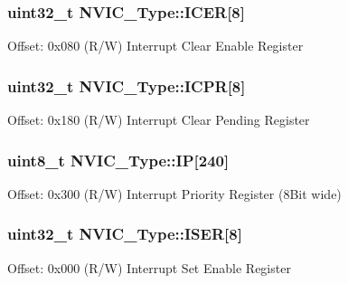 \subsubsection[{\texorpdfstring{I\+C\+ER}{ICER}}]{ uint32\+\_\+t N\+V\+I\+C\+\_\+\+Type\+::\+I\+C\+ER\mbox{[}8\mbox{]}}\hypertarget{struct_n_v_i_c___type_a1965a2e68b61d2e2009621f6949211a5}{}\label{struct_n_v_i_c___type_a1965a2e68b61d2e2009621f6949211a5}
Offset\+: 0x080 (R/W) Interrupt Clear Enable Register 
\subsubsection[{\texorpdfstring{I\+C\+PR}{ICPR}}]{ uint32\+\_\+t N\+V\+I\+C\+\_\+\+Type\+::\+I\+C\+PR\mbox{[}8\mbox{]}}\hypertarget{struct_n_v_i_c___type_a46241be64208436d35c9a4f8552575c5}{}\label{struct_n_v_i_c___type_a46241be64208436d35c9a4f8552575c5}
Offset\+: 0x180 (R/W) Interrupt Clear Pending Register 
\subsubsection[{\texorpdfstring{IP}{IP}}]{ uint8\+\_\+t N\+V\+I\+C\+\_\+\+Type\+::\+IP\mbox{[}240\mbox{]}}\hypertarget{struct_n_v_i_c___type_a6524789fedb94623822c3e0a47f3d06c}{}\label{struct_n_v_i_c___type_a6524789fedb94623822c3e0a47f3d06c}
Offset\+: 0x300 (R/W) Interrupt Priority Register (8\+Bit wide) 
\subsubsection[{\texorpdfstring{I\+S\+ER}{ISER}}]{ uint32\+\_\+t N\+V\+I\+C\+\_\+\+Type\+::\+I\+S\+ER\mbox{[}8\mbox{]}}\hypertarget{struct_n_v_i_c___type_af90c80b7c2b48e248780b3781e0df80f}{}\label{struct_n_v_i_c___type_af90c80b7c2b48e248780b3781e0df80f}
Offset\+: 0x000 (R/W) Interrupt Set Enable Register 
